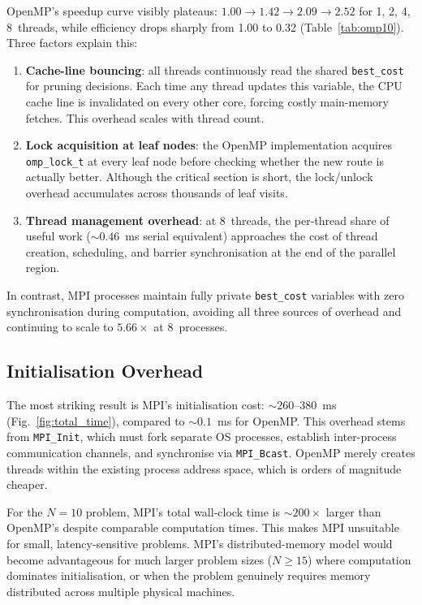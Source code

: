 \documentclass[conference]{IEEEtran}
\begin{document}
OpenMP's speedup curve visibly plateaus: $1.00 \to 1.42 \to 2.09 \to 2.52$
for 1, 2, 4, 8~threads, while efficiency drops sharply from 1.00 to 0.32
(Table~\ref{tab:omp10}). Three factors explain this:

\begin{enumerate}
  \item \textbf{Cache-line bouncing}: all threads continuously read the shared
        \texttt{best\_cost} for pruning decisions. Each time any thread
        updates this variable, the CPU cache line is invalidated on every
        other core, forcing costly main-memory fetches. This overhead
        scales with thread count.
  \item \textbf{Lock acquisition at leaf nodes}: the OpenMP implementation
        acquires \texttt{omp\_lock\_t} at every leaf node before checking
        whether the new route is actually better. Although the critical
        section is short, the lock/unlock overhead accumulates across
        thousands of leaf visits.
  \item \textbf{Thread management overhead}: at 8~threads, the per-thread
        share of useful work (${\sim}0.46$~ms serial equivalent) approaches
        the cost of thread creation, scheduling, and barrier
        synchronisation at the end of the parallel region.
\end{enumerate}

In contrast, MPI processes maintain fully private \texttt{best\_cost}
variables with zero synchronisation during computation, avoiding all three
sources of overhead and continuing to scale to $5.66\times$ at 8~processes.

\subsection{Initialisation Overhead}

The most striking result is MPI's initialisation cost:
${\sim}260$--$380$~ms (Fig.~\ref{fig:total_time}), compared to
${\sim}0.1$~ms for OpenMP. This overhead stems from \texttt{MPI\_Init},
which must fork separate OS processes, establish inter-process communication
channels, and synchronise via \texttt{MPI\_Bcast}. OpenMP merely creates
threads within the existing process address space, which is orders of
magnitude cheaper.

For the $N{=}10$ problem, MPI's total wall-clock time is
${\sim}200\times$ larger than OpenMP's despite comparable computation
times. This makes MPI unsuitable for small, latency-sensitive problems. MPI's
distributed-memory model would become advantageous for much larger problem
sizes ($N \geq 15$) where computation dominates initialisation, or when the
problem genuinely requires memory distributed across multiple physical
machines.
\end{document}
